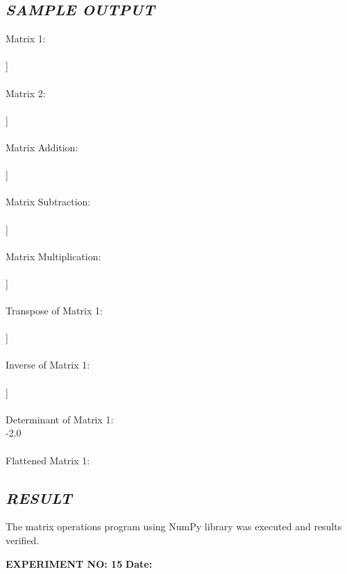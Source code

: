 \documentclass[11pt,a4paper]{article}
\begin{document}
\subsection*{\textit{SAMPLE OUTPUT}}
\begin{tcolorbox}[colback=black!85,colframe=navyblue,title=\textbf{Terminal Output},coltitle=white,fonttitle=\bfseries\small]
\small\ttfamily\color{green!30!white}
Matrix 1:\\
[[1 2]\\
 [3 4]]\\
\\
Matrix 2:\\
[[5 6]\\
 [7 8]]\\
\\
Matrix Addition:\\
[[ 6  8]\\
 [10 12]]\\
\\
Matrix Subtraction:\\
[[-4 -4]\\
 [-4 -4]]\\
\\
Matrix Multiplication:\\
[[19 22]\\
 [43 50]]\\
\\
Transpose of Matrix 1:\\
[[1 3]\\
 [2 4]]\\
\\
Inverse of Matrix 1:\\
[[-2.   1. ]\\
 [ 1.5 -0.5]]\\
\\
Determinant of Matrix 1:\\
-2.0\\
\\
Flattened Matrix 1:\\
[1 2 3 4]
\end{tcolorbox}

\subsection*{\textit{RESULT}}
The matrix operations program using NumPy library was executed and results verified.

\newpage

\noindent
\textbf{\large EXPERIMENT NO: 15} \hfill \textbf{\large Date: \underline{\hspace{3cm}}}
\end{document}
